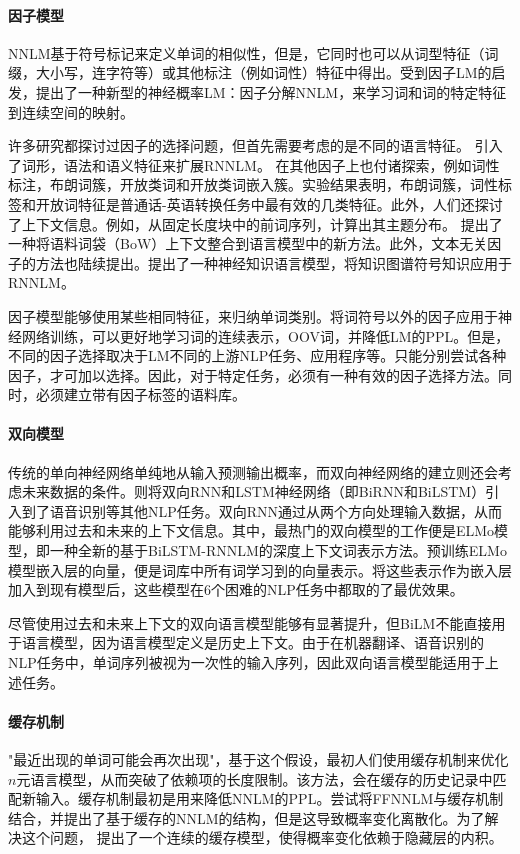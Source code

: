 \documentclass[a4paper, 12pt, twocolumn]{article}
\begin{document}
\paragraph{因子模型}
NNLM基于符号标记来定义单词的相似性，但是，它同时也可以从词型特征（词缀，大小写，连字符等）或其他标注（例如词性）特征中得出。受到因子LM的启发，\cite{alexandrescu2006factored}提出了一种新型的神经概率LM：因子分解NNLM，来学习词和词的特定特征到连续空间的映射。

许多研究都探讨过因子的选择问题，但首先需要考虑的是不同的语言特征。 \cite{wu2012factored}引入了词形，语法和语义特征来扩展RNNLM。 \cite{adel2015syntactic}在其他因子上也付诸探索，例如词性标注，布朗词簇，开放类词和开放类词嵌入簇。实验结果表明，布朗词簇，词性标签和开放词特征是普通话-英语转换任务中最有效的几类特征。此外，人们还探讨了上下文信息。例如，\cite{mikolov2012subword}从固定长度块中的前词序列，计算出其主题分布。 \cite{wang2015larger}提出了一种将语料词袋（BoW）上下文整合到语言模型中的新方法。此外，文本无关因子的方法也陆续提出。\cite{ahn2016neural}提出了一种神经知识语言模型，将知识图谱符号知识应用于RNNLM。

因子模型能够使用某些相同特征，来归纳单词类别。将词符号以外的因子应用于神经网络训练，可以更好地学习词的连续表示，OOV词，并降低LM的PPL。但是，不同的因子选择取决于LM不同的上游NLP任务、应用程序等。只能分别尝试各种因子，才可加以选择。因此，对于特定任务，必须有一种有效的因子选择方法。同时，必须建立带有因子标签的语料库。
\paragraph{双向模型}
传统的单向神经网络单纯地从输入预测输出概率，而双向神经网络的建立则还会考虑未来数据的条件。\cite{graves2013hybrid,bahdanau2014neural}则将双向RNN和LSTM神经网络（即BiRNN和BiLSTM）引入到了语音识别等其他NLP任务。双向RNN通过从两个方向处理输入数据，从而能够利用过去和未来的上下文信息。其中，最热门的双向模型的工作便是ELMo模型\cite{peters2018deep}，即一种全新的基于BiLSTM-RNNLM的深度上下文词表示方法。预训练ELMo模型嵌入层的向量，便是词库中所有词学习到的向量表示。将这些表示作为嵌入层加入到现有模型后，这些模型在6个困难的NLP任务中都取的了最优效果。

尽管使用过去和未来上下文的双向语言模型能够有显著提升，但BiLM不能直接用于语言模型，因为语言模型定义是历史上下文。由于在机器翻译、语音识别的NLP任务中，单词序列被视为一次性的输入序列，因此双向语言模型能适用于上述任务。
\paragraph{缓存机制}
"最近出现的单词可能会再次出现"，基于这个假设，最初人们使用缓存机制来优化$n$元语言模型，从而突破了依赖项的长度限制。该方法，会在缓存的历史记录中匹配新输入。缓存机制最初是用来降低NNLM的PPL。\cite{soutner2012neural}尝试将FFNNLM与缓存机制结合，并提出了基于缓存的NNLM的结构，但是这导致概率变化离散化。为了解决这个问题，\cite{grave2016improving}
提出了一个连续的缓存模型，使得概率变化依赖于隐藏层的内积。
\end{document}
